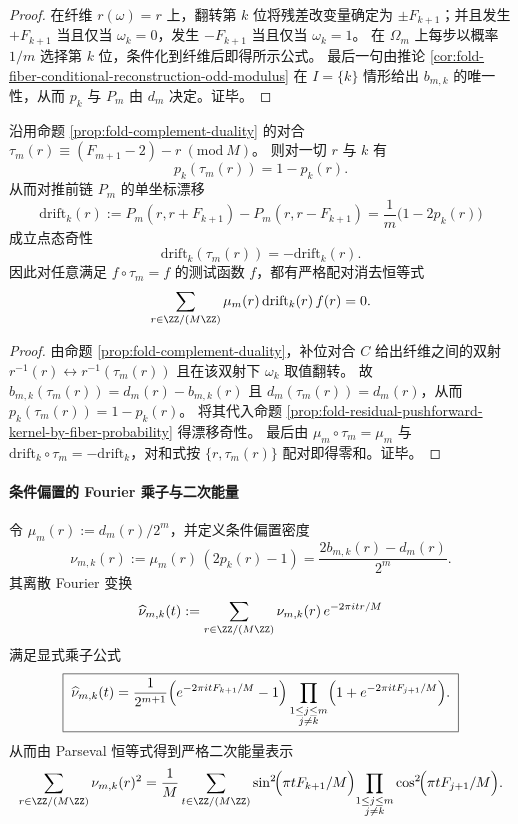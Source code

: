\begin{proof}
在纤维 \(r(\omega)=r\) 上，翻转第 \(k\) 位将残差改变量确定为 \(\pm F_{k+1}\)；并且发生 \(+F_{k+1}\) 当且仅当 \(\omega_k=0\)，发生 \(-F_{k+1}\) 当且仅当 \(\omega_k=1\)。
在 \(\Omega_m\) 上每步以概率 \(1/m\) 选择第 \(k\) 位，条件化到纤维后即得所示公式。
最后一句由推论 \ref{cor:fold-fiber-conditional-reconstruction-odd-modulus} 在 \(I=\{k\}\) 情形给出 \(b_{m,k}\) 的唯一性，从而 \(p_k\) 与 \(P_m\) 由 \(d_m\) 决定。证毕。
\end{proof}

\begin{corollary}[互补对合下的漂移奇性与配对消去]\label{cor:fold-fiber-drift-odd-and-pair-cancellation}
沿用命题 \ref{prop:fold-complement-duality} 的对合
\(
\tau_m(r)\equiv(F_{m+1}-2)-r\ (\mathrm{mod}\ M)
\)。
则对一切 \(r\) 与 \(k\) 有
\[
p_k(\tau_m(r))=1-p_k(r).
\]
从而对推前链 \(P_m\) 的单坐标漂移
\[
\mathrm{drift}_k(r):=P_m(r,r+F_{k+1})-P_m(r,r-F_{k+1})=\frac{1}{m}\bigl(1-2p_k(r)\bigr)
\]
成立点态奇性
\[
\mathrm{drift}_k(\tau_m(r))=-\mathrm{drift}_k(r).
\]
因此对任意满足 \(f\circ\tau_m=f\) 的测试函数 \(f\)，都有严格配对消去恒等式
\[
\sum_{r\in\ZZ/(M\ZZ)}\mu_m(r)\,\mathrm{drift}_k(r)\,f(r)=0.
\]
\end{corollary}

\begin{proof}
由命题 \ref{prop:fold-complement-duality}，补位对合 \(C\) 给出纤维之间的双射
\(
r^{-1}(r)\leftrightarrow r^{-1}(\tau_m(r))
\)
且在该双射下 \(\omega_k\) 取值翻转。
故 \(b_{m,k}(\tau_m(r))=d_m(r)-b_{m,k}(r)\) 且 \(d_m(\tau_m(r))=d_m(r)\)，从而 \(p_k(\tau_m(r))=1-p_k(r)\)。
将其代入命题 \ref{prop:fold-residual-pushforward-kernel-by-fiber-probability} 得漂移奇性。
最后由 \(\mu_m\circ\tau_m=\mu_m\) 与 \(\mathrm{drift}_k\circ\tau_m=-\mathrm{drift}_k\)，对和式按 \(\{r,\tau_m(r)\}\) 配对即得零和。证毕。
\end{proof}

\paragraph{条件偏置的 Fourier 乘子与二次能量}
\begin{proposition}\label{prop:fold-fiber-bias-fourier-multiplier-energy}
令 \(\mu_m(r):=d_m(r)/2^m\)，并定义条件偏置密度
\[
\nu_{m,k}(r):=\mu_m(r)\,(2p_k(r)-1)=\frac{2b_{m,k}(r)-d_m(r)}{2^m}.
\]
其离散 Fourier 变换
\[
\widehat{\nu}_{m,k}(t):=\sum_{r\in\ZZ/(M\ZZ)}\nu_{m,k}(r)\,e^{-2\pi i tr/M}
\]
满足显式乘子公式
\[
\boxed{\;
\widehat{\nu}_{m,k}(t)
=\frac{1}{2^{m+1}}\Bigl(e^{-2\pi i tF_{k+1}/M}-1\Bigr)
\prod_{\substack{1\le j\le m\\ j\ne k}}\Bigl(1+e^{-2\pi i tF_{j+1}/M}\Bigr). \;}
\]
从而由 Parseval 恒等式得到严格二次能量表示
\[
\sum_{r\in\ZZ/(M\ZZ)}\nu_{m,k}(r)^2
=\frac1M\sum_{t\in\ZZ/(M\ZZ)}
\sin^2\!\Bigl(\pi tF_{k+1}/M\Bigr)\!
\prod_{\substack{1\le j\le m\\ j\ne k}}
\cos^2\!\Bigl(\pi tF_{j+1}/M\Bigr).
\]
\end{proposition}

